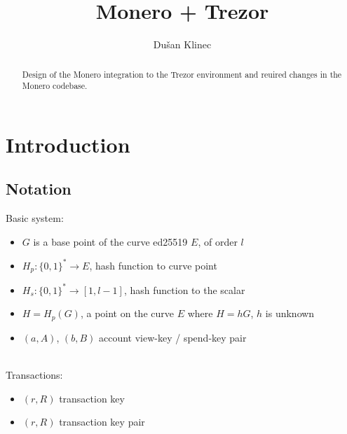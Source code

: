 \documentclass[]{article}
\title{Monero + Trezor}
\author{Du\v{s}an Klinec}
\begin{document}
\maketitle

\begin{abstract}
Design of the Monero integration to the Trezor environment and reuired changes in the Monero codebase.
\end{abstract}

\section{Introduction}

\subsection{Notation}

Basic system:

\begin{itemize}
	\item $G$ is a base point of the curve ed25519 $E$, of order $l$
	\item $H_p : \{0,1\}^* \rightarrow E$, hash function to curve point
	\item $H_s : \{0,1\}^* \rightarrow [1, l-1]$, hash function to the scalar
	\item $H = H_p(G)$, a point on the curve $E$ where $H=hG$, $h$ is unknown
	\item $(a, A)$, $(b, B)$ account view-key / spend-key pair
\end{itemize}
\\

Transactions:

\begin{itemize}
	\item $(r, R)$ transaction key 
	\item $(r, R)$ transaction key pair
\end{itemize}



{}

\end{document}
